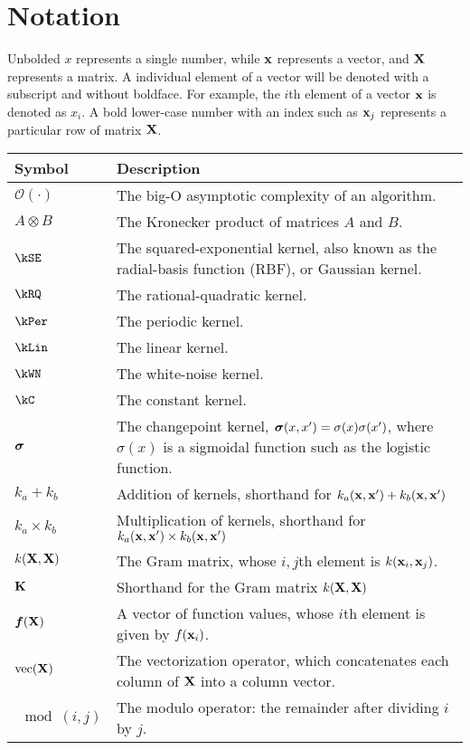 
\inbpdocument

\chapter*{Notation}
\label{ch:notation}


Unbolded $x$ represents a single number, while ${\bf{x}}$ represents a vector, and $\mathbf{X}$ represents a matrix.
A individual element of a vector will be denoted with a subscript and without boldface.
For example, the $i$th element of a vector ${\bf{x}}$ is denoted as $x_i$.
A bold lower-case number with an index such as ${\bf{x}}_j$ represents a particular row of matrix $\mathbf{X}$.

\vspace{1cm}

\begin{tabular}{lm{12cm}}
Symbol \quad     & Description \\
\hline
$\mathcal{O}(\cdot)$ & The big-O asymptotic complexity of an algorithm. \\
$A \otimes B$ & The Kronecker product of matrices $A$ and $B$. \\
$\kSE$ & The squared-exponential kernel, also known as the radial-basis function (RBF), or Gaussian kernel. \\
$\kRQ$ & The rational-quadratic kernel. \\
$\kPer$ & The periodic kernel. \\
$\kLin$ & The linear kernel. \\
$\kWN$ & The white-noise kernel. \\
$\kC$ & The constant kernel. \\
${\boldsymbol{\sigma}}$ & The changepoint kernel, ${\boldsymbol{\sigma}}(x, x') = \sigma(x) \sigma(x')$, where $\sigma(x)$ is a sigmoidal function such as the logistic function. \\
$k_a + k_b$ & Addition of kernels, shorthand for $k_a({\bf{x}}, {\bf{x}}') + k_b({\bf{x}}, {\bf{x}}')$ \\
$k_a \times k_b$& Multiplication of kernels, shorthand for $k_a({\bf{x}}, {\bf{x}}') \times k_b({\bf{x}}, {\bf{x}}')$ \\
$k(\mathbf{X}, \mathbf{X})$ & The Gram matrix, whose $i,j$th element is $k({\bf{x}}_i, {\bf{x}}_j)$. \\
$\mathbf{K}$ & Shorthand for the Gram matrix $k(\mathbf{X}, \mathbf{X})$ \\
$\boldsymbol{f}(\mathbf{X})$ & A vector of function values, whose $i$th element is given by $f({\bf{x}}_i)$. \\
$\textnormal{vec}(\mathbf{X})$ & The vectorization operator, which concatenates each column of $\mathbf{X}$ into a column vector. \\
$\mod(i,j)$ & The modulo operator: the remainder after dividing $i$ by $j$.
\end{tabular}



\outbpdocument{
}



